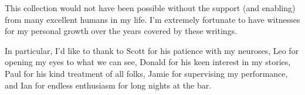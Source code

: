 This collection would not have been possible without the support (and enabling)
from many excellent humans in my life. I'm extremely fortunate to have witnesses
for my personal growth over the years covered by these writings.

In particular, I'd like to thank to Scott for his patience with my neuroses, Leo
for opening my eyes to what we can see, Donald for his keen interest in my
stories, Paul for his kind treatment of all folks, Jamie for supervising my
performance, and Ian for endless enthusiasm for long nights at the bar.
